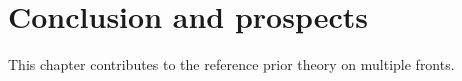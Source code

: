 















\section{Conclusion and prospects}


This chapter contributes to the reference prior theory on multiple fronts.

